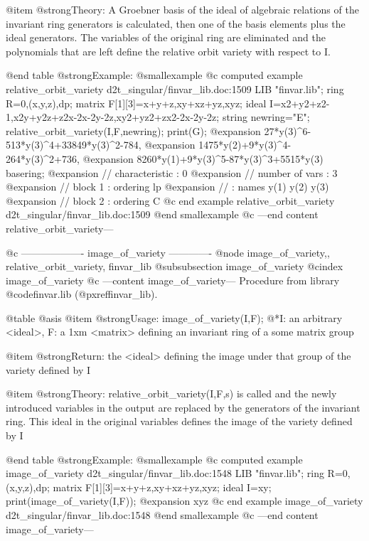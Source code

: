 @item @strong{Theory:}
A Groebner basis of the ideal of algebraic relations of the invariant
ring generators is calculated, then one of the basis elements plus the
ideal generators. The variables of the original ring are eliminated
and the polynomials that are left define the relative orbit variety
with respect to I.

@end table
@strong{Example:}
@smallexample
@c computed example relative_orbit_variety d2t_singular/finvar_lib.doc:1509 
LIB "finvar.lib";
ring R=0,(x,y,z),dp;
matrix F[1][3]=x+y+z,xy+xz+yz,xyz;
ideal I=x2+y2+z2-1,x2y+y2z+z2x-2x-2y-2z,xy2+yz2+zx2-2x-2y-2z;
string newring="E";
relative_orbit_variety(I,F,newring);
print(G);
@expansion{} 27*y(3)^6-513*y(3)^4+33849*y(3)^2-784,
@expansion{} 1475*y(2)+9*y(3)^4-264*y(3)^2+736,
@expansion{} 8260*y(1)+9*y(3)^5-87*y(3)^3+5515*y(3)
basering;
@expansion{} //   characteristic : 0
@expansion{} //   number of vars : 3
@expansion{} //        block   1 : ordering lp
@expansion{} //                  : names    y(1) y(2) y(3) 
@expansion{} //        block   2 : ordering C
@c end example relative_orbit_variety d2t_singular/finvar_lib.doc:1509
@end smallexample
@c ---end content relative_orbit_variety---

@c ------------------- image_of_variety -------------
@node image_of_variety,, relative_orbit_variety, finvar_lib
@subsubsection image_of_variety
@cindex image_of_variety
@c ---content image_of_variety---
Procedure from library @code{finvar.lib} (@pxref{finvar_lib}).

@table @asis
@item @strong{Usage:}
image_of_variety(I,F);
@*I: an arbitrary <ideal>, F: a 1xm <matrix> defining an invariant ring
of a some matrix group

@item @strong{Return:}
the <ideal> defining the image under that group of the variety defined
by I

@item @strong{Theory:}
relative_orbit_variety(I,F,s) is called and the newly introduced
variables in the output are replaced by the generators of the
invariant ring. This ideal in the original variables defines the image
of the variety defined by I

@end table
@strong{Example:}
@smallexample
@c computed example image_of_variety d2t_singular/finvar_lib.doc:1548 
LIB "finvar.lib";
ring R=0,(x,y,z),dp;
matrix F[1][3]=x+y+z,xy+xz+yz,xyz;
ideal I=xy;
print(image_of_variety(I,F));
@expansion{} xyz
@c end example image_of_variety d2t_singular/finvar_lib.doc:1548
@end smallexample
@c ---end content image_of_variety---
